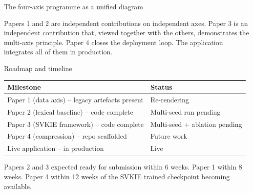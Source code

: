 \documentclass{beamer}
\begin{document}
\begin{frame}{The four-axis programme as a unified diagram}
  \begin{center}
  \end{center}
  \vspace{0.5em}
  Papers 1 and 2 are independent contributions on independent axes.
  Paper 3 is an independent contribution that, viewed together with the
  others, demonstrates the multi-axis principle.  Paper 4 closes the
  deployment loop.  The application integrates all of them in
  production.
\end{frame}

\begin{frame}{Roadmap and timeline}
  \begin{center}
  \small
  \begin{tabular}{ll}
    \toprule
    Milestone & Status \\ \midrule
    Paper 1 (data axis) -- legacy artefacts present       & Re-rendering \\
    Paper 2 (lexical baseline) -- code complete           & Multi-seed run pending \\
    Paper 3 (SVKIE framework) -- code complete            & Multi-seed + ablation pending \\
    Paper 4 (compression) -- repo scaffolded              & Future work \\
    Live application -- in production                     & Live \\
    \bottomrule
  \end{tabular}
  \end{center}
  \vspace{0.5em}
  Papers 2 and 3 expected ready for submission within 6 weeks.
  Paper 1 within 8 weeks.  Paper 4 within 12 weeks of the SVKIE
  trained checkpoint becoming available.
\end{frame}
\end{document}
